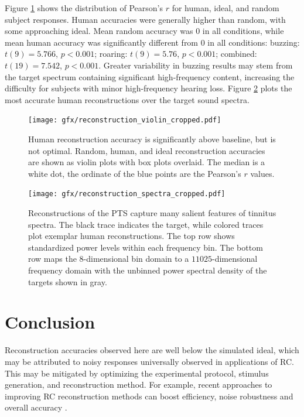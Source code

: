 \documentclass[journal]{IEEEtran}
\begin{document}
Figure \ref{fig:reconstructions} shows the distribution of Pearson's $r$ for human, ideal, and random subject responses.
Human accuracies were generally higher than random,
with some approaching ideal.
Mean random accuracy was $0$ in all conditions,
while mean human accuracy was significantly different from $0$ in all conditions: buzzing: $t(9) = 5.766$, $p < 0.001$; roaring: $t(9) = 5.76$, $p < 0.001$; combined: $t(19) = 7.542$, $p < 0.001$.
Greater variability in buzzing results may stem from the target spectrum containing significant high-frequency content, increasing the difficulty for subjects with minor high-frequency hearing loss.
Figure \ref{fig:spectra} plots the most accurate human reconstructions over the target sound spectra.

\begin{figure}[ht]
    \centering
    \texttt{[image: gfx/reconstruction\_violin\_cropped.pdf]}
    \caption{Human reconstruction accuracy is significantly above baseline,
    but is not optimal. Random, human, and ideal reconstruction accuracies
    are shown as violin plots with box plots overlaid.
    The median is a white dot, the ordinate of the blue points are the Pearson's $r$ values.}
    \label{fig:reconstructions}
\end{figure}

\begin{figure}[ht]
    \centering
    \texttt{[image: gfx/reconstruction\_spectra\_cropped.pdf]}
    \caption{Reconstructions of the PTS capture many salient features of tinnitus spectra.
    The black trace indicates the target,
    while colored traces plot exemplar human reconstructions.
    The top row shows standardized power levels within each frequency bin.
    The bottom row maps the $8$-dimensional bin domain
    to a $11025$-dimensional frequency domain with the unbinned power spectral density of the targets shown in gray.}
    \label{fig:spectra}
\end{figure}

\section{Conclusion}

Reconstruction accuracies observed here are well below the simulated ideal,
which may be attributed to noisy responses universally observed in applications of RC.
This may be mitigated by optimizing the experimental protocol, stimulus generation, and reconstruction method.
For example, recent approaches to improving RC reconstruction methods can boost efficiency, noise robustness and overall accuracy \cite{roopCompressiveSensingApproach2021,comptonStimulusWhiteningImproves2022a}.
\end{document}
